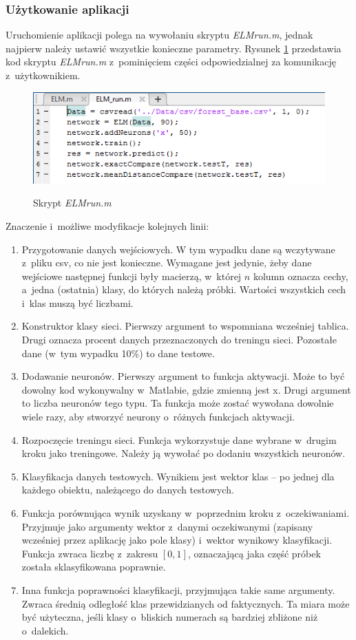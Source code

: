 \documentclass{article}
\begin{document}
\subsubsection*{Użytkowanie aplikacji}
Uruchomienie aplikacji polega na wywołaniu skryptu \textit{ELM\textunderscore run.m}, jednak najpierw należy ustawić wszystkie konieczne parametry. Rysunek \ref{elm_run} przedstawia kod skryptu \textit{ELM\textunderscore run.m} z~pominięciem części odpowiedzialnej za komunikację z~użytkownikiem.
\begin{figure}[H]
\centering
\includegraphics[width=1\textwidth]{elm_run.png}
\label{elm_run}
\caption{Skrypt \textit{ELM\textunderscore run.m}}
\end{figure}
Znaczenie i~możliwe modyfikacje kolejnych linii:
\begin{enumerate}
\item Przygotowanie danych wejściowych.
W tym wypadku dane są wczytywane z~pliku csv, co nie jest konieczne.
Wymagane jest jedynie, żeby dane wejściowe następnej funkcji były macierzą, w~której $n$ kolumn oznacza cechy, a~jedna (ostatnia) klasy, do których należą próbki. Wartości wszystkich cech i~klas muszą być liczbami.
\item Konstruktor klasy sieci. 
Pierwszy argument to wspomniana wcześniej tablica. 
Drugi oznacza procent danych przeznaczonych do treningu sieci.
Pozostałe dane (w~tym wypadku 10\%) to dane testowe.
\item Dodawanie neuronów.
Pierwszy argument to funkcja aktywacji.
Może to być dowolny kod wykonywalny w~Matlabie, gdzie zmienną jest x.
Drugi argument to liczba neuronów tego typu.
Ta funkcja może zostać wywołana dowolnie wiele razy, aby stworzyć neurony o~różnych funkcjach aktywacji.
\item Rozpoczęcie treningu sieci. 
Funkcja wykorzystuje dane wybrane w~drugim kroku jako treningowe.
Należy ją wywołać po dodaniu wszystkich neuronów.
\item Klasyfikacja danych testowych.
Wynikiem jest wektor klas -- po jednej dla każdego obiektu, należącego do danych testowych.
\item Funkcja porównująca wynik uzyskany w~poprzednim kroku z~oczekiwaniami.
Przyjmuje jako argumenty wektor z~danymi oczekiwanymi (zapisany wcześniej przez aplikację jako pole klasy) i~wektor wynikowy klasyfikacji.
Funkcja zwraca liczbę z~zakresu $[0, 1]$, oznaczającą jaka część próbek została sklasyfikowana poprawnie.
\item Inna funkcja poprawności klasyfikacji, przyjmująca takie same argumenty.
Zwraca średnią odległość klas przewidzianych od faktycznych.
Ta miara może być użyteczna, jeśli klasy o~bliskich numerach są bardziej zbliżone niż o~dalekich.
\end{enumerate}
\end{document}
